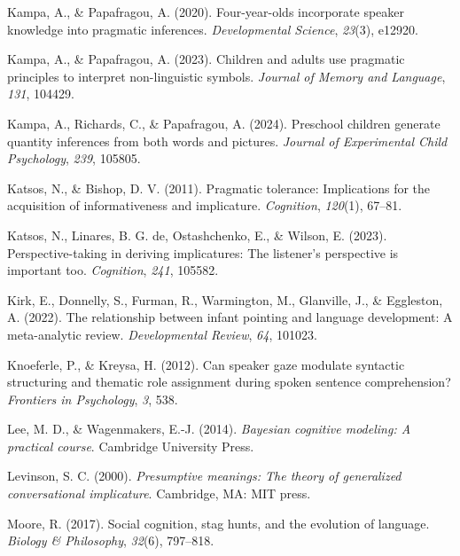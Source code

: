 \documentclass[
  man,floatsintext]{apa6}
\newlength{\cslhangindent}
\newenvironment{CSLReferences}[2] %
 {\begin{list}{}{%
  \setlength{\itemindent}{0pt}
  \setlength{\leftmargin}{0pt}
  \setlength{\parsep}{0pt}
  \ifodd #1
   \setlength{\leftmargin}{\cslhangindent}
   \setlength{\itemindent}{-1\cslhangindent}
  \fi
  \setlength{\itemsep}{#2\baselineskip}}}
 {\end{list}}
\begin{document}
\begin{CSLReferences}{1}{0}
Kampa, A., \& Papafragou, A. (2020). Four-year-olds incorporate speaker knowledge into pragmatic inferences. \emph{Developmental Science}, \emph{23}(3), e12920.

Kampa, A., \& Papafragou, A. (2023). Children and adults use pragmatic principles to interpret non-linguistic symbols. \emph{Journal of Memory and Language}, \emph{131}, 104429.

Kampa, A., Richards, C., \& Papafragou, A. (2024). Preschool children generate quantity inferences from both words and pictures. \emph{Journal of Experimental Child Psychology}, \emph{239}, 105805.

Katsos, N., \& Bishop, D. V. (2011). Pragmatic tolerance: Implications for the acquisition of informativeness and implicature. \emph{Cognition}, \emph{120}(1), 67--81.

Katsos, N., Linares, B. G. de, Ostashchenko, E., \& Wilson, E. (2023). Perspective-taking in deriving implicatures: The listener's perspective is important too. \emph{Cognition}, \emph{241}, 105582.

Kirk, E., Donnelly, S., Furman, R., Warmington, M., Glanville, J., \& Eggleston, A. (2022). The relationship between infant pointing and language development: A meta-analytic review. \emph{Developmental Review}, \emph{64}, 101023.

Knoeferle, P., \& Kreysa, H. (2012). Can speaker gaze modulate syntactic structuring and thematic role assignment during spoken sentence comprehension? \emph{Frontiers in Psychology}, \emph{3}, 538.

Lee, M. D., \& Wagenmakers, E.-J. (2014). \emph{Bayesian cognitive modeling: A practical course}. Cambridge University Press.

Levinson, S. C. (2000). \emph{Presumptive meanings: The theory of generalized conversational implicature}. Cambridge, MA: MIT press.

Moore, R. (2017). Social cognition, stag hunts, and the evolution of language. \emph{Biology \& Philosophy}, \emph{32}(6), 797--818.


\end{CSLReferences}
\end{document}
